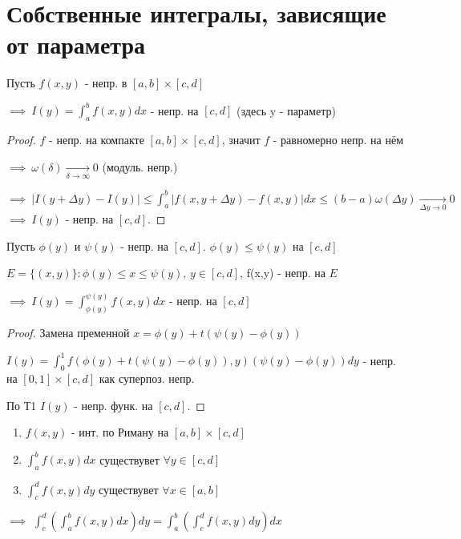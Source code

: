 \documentclass{article}
\begin{document}
\section{Собственные интегралы, зависящие от параметра}
\begin{theorem}[Т1]
  Пусть $f(x,y)$ - непр. в $[a,b]\times [c,d]$

  $\implies \ I(y)=\int_{a}^{b}f(x,y)dx$ - непр. на $[c,d]$ (здесь y - параметр)
\end{theorem}
\begin{proof}
  $f$ - непр. на компакте $[a,b]\times [c,d]$, значит $f$ - равномерно непр. на нём 

  $\implies \ \omega(\delta) \underset{\delta\to\infty}{\to}0$ (модуль. непр.)

  $\implies \ |I(y+\Delta y)-I(y)| \le \int_{a}^{b}|f(x,y+\Delta y)-f(x,y)|dx \le 
  (b-a)\omega(\Delta y) \underset{\Delta y \to 0}{\to} 0$
  $\implies \ I(y)$ - непр. на $[c,d]$.
\end{proof}
\begin{theorem}[Т2]
  Пусть $\phi(y)$ и $\psi(y)$ - непр. на $[c,d]$. $\phi(y) \le \psi(y)$ на $[c,d]$

  $E=\{(x,y)\}: \phi(y)\le x \le \psi(y), \, y\in [c,d]$, f(x,y) - непр. на $E$

  $\implies \ I(y)=\int_{\phi(y)}^{\psi(y)}f(x,y)dx$ - непр. на $[c,d]$
\end{theorem}
\begin{proof}
  Замена пременной $x=\phi(y)+t(\psi(y)-\phi(y))$

  $I(y)=\int_{0}^{1}f(\phi(y)+t(\psi(y)-\phi(y)), y)(\psi(y)-\phi(y))dy$ - непр. на $[0,1]\times [c,d]$ как суперпоз. непр.

  По Т1 $I(y)$ - непр. функ. на $[c,d]$.
\end{proof}
\begin{theorem}
  \phantom{.}

  \begin{enumerate}
  \item $f(x,y)$ - инт. по Риману на $[a,b]\times [c,d]$
  \item $\int_{a}^{b}f(x,y)dx$ существувет $\forall y \in [c,d]$
  \item $\int_{c}^{d}f(x,y)dy$ существувет $\forall x \in [a,b]$
  \end{enumerate}
  $\implies$ $\int_{c}^{d}(\int_{a}^{b}f(x,y)dx)dy=\int_{a}^{b}(\int_{c}^{d}f(x,y)dy)dx$
\end{theorem}
\end{document}
